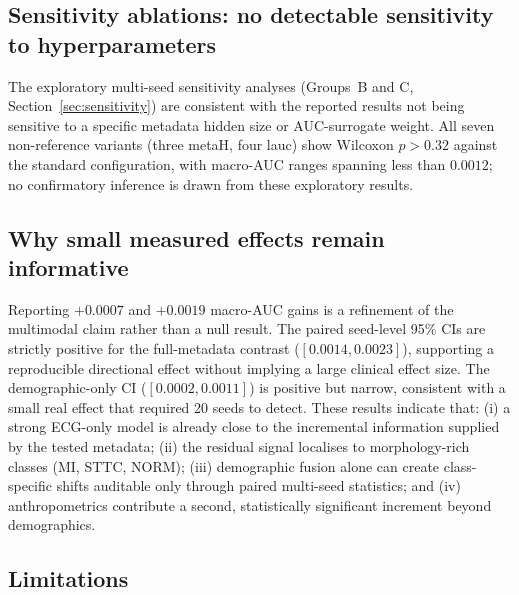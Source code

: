 \documentclass[mathematics,article,submit,pdftex]{Definitions/mdpi}
\begin{document}
\subsection{Sensitivity ablations: no detectable sensitivity to hyperparameters}
The exploratory multi-seed sensitivity analyses (Groups~B and C, Section~\ref{sec:sensitivity}) are consistent with the reported results not being sensitive to a specific metadata hidden size or AUC-surrogate weight. All seven non-reference variants (three metaH, four lauc) show Wilcoxon $p{>}0.32$ against the standard configuration, with macro-AUC ranges spanning less than $0.0012$; no confirmatory inference is drawn from these exploratory results.

\subsection{Why small measured effects remain informative}
Reporting $+0.0007$ and $+0.0019$ macro-AUC gains is a refinement of the multimodal claim rather than a null result. The paired seed-level 95\% CIs are strictly positive for the full-metadata contrast ($[0.0014, 0.0023]$), supporting a reproducible directional effect without implying a large clinical effect size. The demographic-only CI ($[0.0002, 0.0011]$) is positive but narrow, consistent with a small real effect that required 20 seeds to detect. These results indicate that: (i) a strong ECG-only model is already close to the incremental information supplied by the tested metadata; (ii) the residual signal localises to morphology-rich classes (MI, STTC, NORM); (iii) demographic fusion alone can create class-specific shifts auditable only through paired multi-seed statistics; and (iv) anthropometrics contribute a second, statistically significant increment beyond demographics.

\subsection{Limitations}\label{sec:limits}
\end{document}
